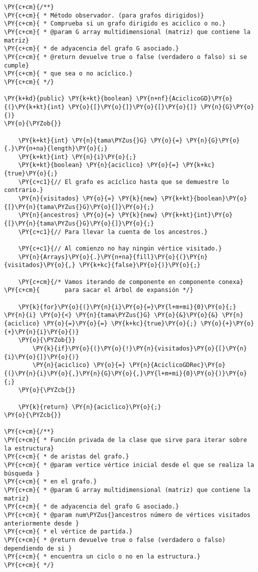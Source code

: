 \begin{Verbatim}[commandchars=\\\{\}]
\PY{c+cm}{/**}
\PY{c+cm}{ * Método observador. (para grafos dirigidos)}
\PY{c+cm}{ * Comprueba si un grafo dirigido es aciclico o no.}
\PY{c+cm}{ * @param G array multidimensional (matriz) que contiene la matriz}
\PY{c+cm}{ * de adyacencia del grafo G asociado.}
\PY{c+cm}{ * @return devuelve true o false (verdadero o falso) si se cumple}
\PY{c+cm}{ * que sea o no acíclico.}
\PY{c+cm}{ */}

\PY{k+kd}{public} \PY{k+kt}{boolean} \PY{n+nf}{AciclicoGD}\PY{o}{(}\PY{k+kt}{int} \PY{o}{[}\PY{o}{]}\PY{o}{[}\PY{o}{]} \PY{n}{G}\PY{o}{)}
\PY{o}{\PYZob{}}
	
    \PY{k+kt}{int} \PY{n}{tama\PYZus{}G} \PY{o}{=} \PY{n}{G}\PY{o}{.}\PY{n+na}{length}\PY{o}{;}
    \PY{k+kt}{int} \PY{n}{i}\PY{o}{;}
    \PY{k+kt}{boolean} \PY{n}{aciclico} \PY{o}{=} \PY{k+kc}{true}\PY{o}{;} 
    \PY{c+c1}{// El grafo es acíclico hasta que se demuestre lo contrario.}
    \PY{n}{visitados} \PY{o}{=} \PY{k}{new} \PY{k+kt}{boolean}\PY{o}{[}\PY{n}{tama\PYZus{}G}\PY{o}{]}\PY{o}{;}
    \PY{n}{ancestros} \PY{o}{=} \PY{k}{new} \PY{k+kt}{int}\PY{o}{[}\PY{n}{tama\PYZus{}G}\PY{o}{]}\PY{o}{;}
    \PY{c+c1}{// Para llevar la cuenta de los ancestros.}

    \PY{c+c1}{// Al comienzo no hay ningún vértice visitado.}
    \PY{n}{Arrays}\PY{o}{.}\PY{n+na}{fill}\PY{o}{(}\PY{n}{visitados}\PY{o}{,} \PY{k+kc}{false}\PY{o}{)}\PY{o}{;}

    \PY{c+cm}{/* Vamos iterando de componente en componente conexa}
\PY{c+cm}{       para sacar el árbol de expansión */}

    \PY{k}{for}\PY{o}{(}\PY{n}{i}\PY{o}{=}\PY{l+m+mi}{0}\PY{o}{;} \PY{n}{i} \PY{o}{<} \PY{n}{tama\PYZus{}G} \PY{o}{&}\PY{o}{&} \PY{n}{aciclico} \PY{o}{=}\PY{o}{=} \PY{k+kc}{true}\PY{o}{;} \PY{o}{+}\PY{o}{+}\PY{n}{i}\PY{o}{)}
	\PY{o}{\PYZob{}}
	    \PY{k}{if}\PY{o}{(}\PY{o}{!}\PY{n}{visitados}\PY{o}{[}\PY{n}{i}\PY{o}{]}\PY{o}{)}
		\PY{n}{aciclico} \PY{o}{=} \PY{n}{AciclicoGDRec}\PY{o}{(}\PY{n}{i}\PY{o}{,}\PY{n}{G}\PY{o}{,}\PY{l+m+mi}{0}\PY{o}{)}\PY{o}{;}
	\PY{o}{\PYZcb{}}
	
    \PY{k}{return} \PY{n}{aciclico}\PY{o}{;}
\PY{o}{\PYZcb{}}

\PY{c+cm}{/**}
\PY{c+cm}{ * Función privada de la clase que sirve para iterar sobre la estructura}
\PY{c+cm}{ * de aristas del grafo.}
\PY{c+cm}{ * @param vertice vértice inicial desde el que se realiza la búsqueda }
\PY{c+cm}{ * en el grafo.}
\PY{c+cm}{ * @param G array multidimensional (matriz) que contiene la matriz}
\PY{c+cm}{ * de adyacencia del grafo G asociado.}
\PY{c+cm}{ * @param num\PYZus{}ancestros número de vértices visitados anteriormente desde }
\PY{c+cm}{ * el vértice de partida.}
\PY{c+cm}{ * @return devuelve true o false (verdadero o falso) dependiendo de si }
\PY{c+cm}{ * encuentra un ciclo o no en la estructura.}
\PY{c+cm}{ */}


\end{Verbatim}
